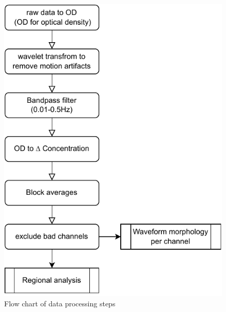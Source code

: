 \begin{figure}[H]
  \centering
    \includegraphics[scale=.95]{pdf/flowchart2.pdf}
  \caption{Flow chart of data processing steps}
  \label{fig:flowchart}
\end{figure}


